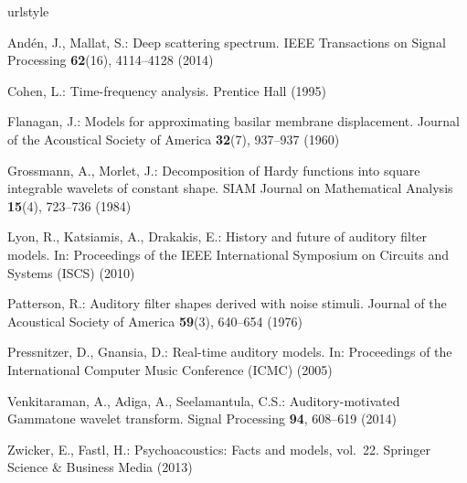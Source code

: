 \documentclass[smallextended]{svjour3}
\begin{document}
\begin{thebibliography}{10}
\providecommand{\url}[1]{{#1}}
\providecommand{\urlprefix}{URL }
\expandafter\ifx\csname urlstyle\endcsname\relax
  \providecommand{\doi}[1]{DOI~\discretionary{}{}{}#1}\else
  \providecommand{\doi}{DOI~\discretionary{}{}{}\begingroup
  \urlstyle{rm}\Url}\fi


And{\'e}n, J., Mallat, S.: Deep scattering spectrum.
\newblock IEEE Transactions on Signal Processing \textbf{62}(16), 4114--4128
  (2014)

Cohen, L.: Time-frequency analysis.
\newblock Prentice Hall (1995)

Flanagan, J.: Models for approximating basilar membrane displacement.
\newblock Journal of the Acoustical Society of America \textbf{32}(7), 937--937
  (1960)

Grossmann, A., Morlet, J.: {Decomposition of Hardy functions into square
  integrable wavelets of constant shape}.
\newblock SIAM Journal on Mathematical Analysis \textbf{15}(4), 723--736 (1984)


Lyon, R., Katsiamis, A., Drakakis, E.: History and future of auditory filter
  models.
\newblock In: Proceedings of the IEEE International Symposium on Circuits and
  Systems (ISCS) (2010)

Patterson, R.: Auditory filter shapes derived with noise stimuli.
\newblock Journal of the Acoustical Society of America \textbf{59}(3), 640--654
  (1976)

Pressnitzer, D., Gnansia, D.: Real-time auditory models.
\newblock In: Proceedings of the International Computer Music Conference (ICMC)
  (2005)


Venkitaraman, A., Adiga, A., Seelamantula, C.S.: {Auditory-motivated Gammatone
  wavelet transform}.
\newblock Signal Processing \textbf{94}, 608--619 (2014)


Zwicker, E., Fastl, H.: Psychoacoustics: Facts and models, vol.~22.
\newblock Springer Science \& Business Media (2013)







\end{thebibliography}
\end{document}
